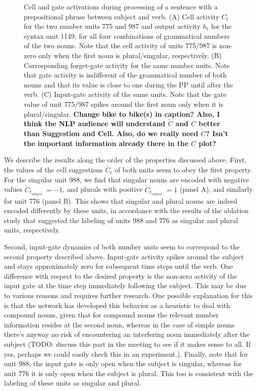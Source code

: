 \begin{figure}[ht]
\begin{subfigure}{0.3\textwidth}
    \end{subfigure}
\caption{Cell and gate activations during processing of a sentence with a prepositional phrase between subject and verb. 
(A) Cell activity $C_t$ for the two number units 775 and 987 and output activity $h_t$ for the syntax unit 1149, for all four combinations of grammatical numbers of the two nouns. 
Note that the cell activity of units 775/987 is non-zero only when the first noun is plural/singular, respectively. 
(B) Corresponding forget-gate activity for the same number units. 
Note that gate activity is indifferent of the grammatical number of both nouns and that its value is close to one during the PP until after the verb. 
(C) Input-gate activity of the same units. 
Note that the gate value of unit 775/987 spikes around the first noun only when it is plural/singular. \textbf{Change bike to bike(s) in caption? Also, I think the NLP audience will understand $\tilde{C}$ and $C$ better than Suggestion and Cell. Also, do we really need  $\tilde{C}$? Isn't the important information already there in the $C$ plot?}}
\end{figure}


We describe the results along the order of the properties discussed above. 
First, the values of the cell suggestions $\tilde{C_t}$ of both units seem to obey the first property. 
For the singular unit 988, we find that singular nouns are encoded with negative values $\tilde{C}_{t_{subject}}~=-1$, and plurals with positive $\tilde{C}_{t_{subject}}~=1$ (panel A), and similarly for unit 776 (panel B). 
This shows that singular and plural nouns are indeed encoded differently by these units, in accordance with the results of the ablation study that suggested the labeling of units 988 and 776 as singular and plural units, respectively.


Second, input-gate dynamics of both number units seem to correspond to the second property described above. 
Input-gate activity spikes around the subject and stays approximately zero for subsequent time steps until the verb. 
One difference with respect to the desired property is the non-zero activity of the input gate at the time step immediately following the subject. 
This may be due to various reasons and requires further research. 
One possible explanation for this is that the network has developed this behavior as a heuristic to deal with compound nouns, given that for compound nouns the relevant number information resides at the second noun, whereas in the case of simple nouns there's anyway no risk of encountering an interfering noun immediately after the subject (TODO: discuss this part in the meeting to see if it makes sense to all. 
If yes, perhaps we could easily check this in an experiment.). 
Finally, note that for unit 988, the input gate is only open when the subject is singular, whereas for unit 776 it is only open when the subject is plural. 
This too is consistent with the labeling of these units as singular and plural.


